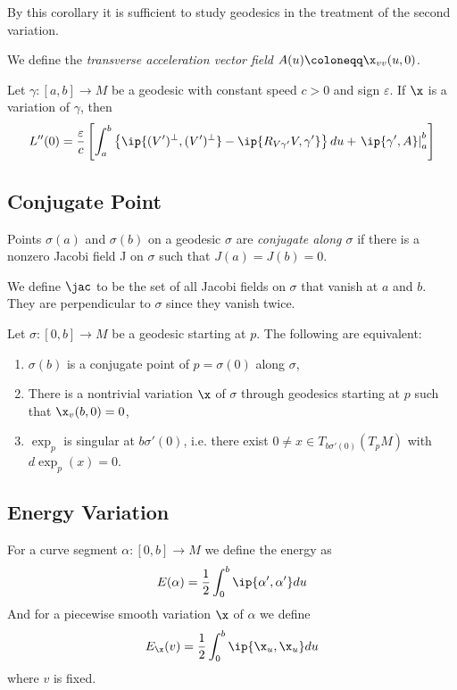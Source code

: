 By this corollary it is sufficient to study geodesics in the treatment of the second variation.

We define the \emph{transverse acceleration vector field} $A(u)\coloneqq\x_{vv}(u,0)$.

\begin{proposition}Let $\gamma:[a,b]\to M$ be a geodesic with constant speed $c>0$ and sign $\varepsilon$. If $\x$ is a variation of $\gamma$, then
\[
L''(0) = \frac{\varepsilon}{c}\left[
\int_a^b\left\{ \ip{(V')^\perp,(V')^\perp}
-\ip{R_{V\gamma'}V,\gamma'}\right\} du
+\left.\ip{\gamma',A}\right\rvert_a^b\right]
\]
\end{proposition}

\subsection{Conjugate Point}
\begin{definition}
Points $\sigma(a)$ and $\sigma(b)$ on a geodesic $\sigma$ are \emph{conjugate along $\sigma$} if there is a nonzero Jacobi field J on $\sigma$ such that $J(a) = J(b) = 0$.
\end{definition}

We define $\jac$ to be the set of all Jacobi fields on $\sigma$ that vanish at $a$ and $b$.
They are perpendicular to $\sigma$ since they vanish twice.

\begin{proposition}
Let $\sigma:[0,b]\to M$ be a geodesic starting at $p$. The following are equivalent:

\begin{enumerate}
    \item $\sigma(b)$ is a conjugate point of $p=\sigma(0)$ along $\sigma$,
    \item There is a nontrivial variation $\x$ of $\sigma$ through geodesics starting at $p$ such that $\x_v(b,0)=0$,
    \item $\exp_p$ is singular at $b\sigma'(0)$, i.e. there exist $0\neq x\in T_{b\sigma'(0)}(T_pM)$ with $d\exp_p(x)=0$.
\end{enumerate}
\end{proposition}

\subsection{Energy Variation}
For a curve segment $\alpha:[0,b]\to M$ we define the energy as 
\[
E(\alpha) = \frac{1}{2}\int_0^b\ip{\alpha',\alpha'}du
\]
And for a piecewise smooth variation $\x$ of $\alpha$ we define
\[
E_\x(v) = \frac{1}{2}\int_0^b\ip{\x_u,\x_u}du
\]
where $v$ is fixed.

